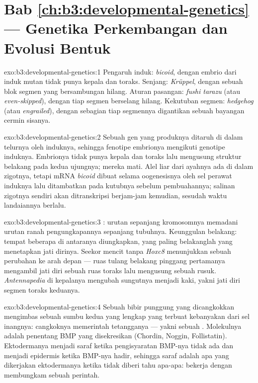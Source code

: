 \section*{Bab \ref{ch:b3:developmental-genetics} --- Genetika Perkembangan dan Evolusi Bentuk}

\begin{solution}{exo:b3:developmental-genetics:1}
Pengaruh induk: \emph{bicoid}, dengan embrio dari induk mutan tidak punya kepala
dan toraks. Senjang: \emph{Krüppel}, dengan sebuah blok segmen yang bersambungan
hilang. Aturan pasangan: \emph{fushi tarazu} (atau \emph{even-skipped}), dengan tiap
segmen berselang hilang. Kekutuban segmen: \emph{hedgehog} (atau
\emph{engrailed}), dengan sebagian tiap segmennya digantikan sebuah bayangan cermin
sisanya.
\end{solution}

\begin{solution}{exo:b3:developmental-genetics:2}
Sebuah gen yang produknya ditaruh di dalam telurnya oleh induknya, sehingga
fenotipe embrionya mengikuti genotipe induknya. Embrionya tidak punya kepala dan
toraks lalu mengusung struktur belakang pada kedua ujungnya; mereka mati.
Alel liar dari ayahnya ada di dalam zigotnya, tetapi mRNA \emph{bicoid}
dibuat selama oogenesisnya oleh sel perawat induknya lalu ditambatkan pada
kutubnya sebelum pembuahannya; salinan zigotnya sendiri akan ditranskripsi
berjam-jam kemudian, sesudah waktu landaiannya berlalu.
\end{solution}

\begin{solution}{exo:b3:developmental-genetics:3}
: urutan  sepanjang kromosomnya memadani
urutan ranah pengungkapannya sepanjang tubuhnya. Keunggulan belakang:
tempat beberapa di antaranya diungkapkan, yang paling belakanglah yang menetapkan jati dirinya.
Seekor mencit tanpa \emph{Hoxc8} menunjukkan sebuah perubahan ke arah depan --- ruas
tulang belakang pinggang pertamanya mengambil jati diri sebuah ruas toraks lalu mengusung
sebuah rusuk. \emph{Antennapedia} di kepalanya mengubah sungutnya menjadi kaki, yakni
jati diri segmen toraks keduanya.
\end{solution}

\begin{solution}{exo:b3:developmental-genetics:4}
Sebuah bibir punggung yang dicangkokkan mengimbas sebuah sumbu kedua yang lengkap yang terbuat kebanyakan dari
sel inangnya: cangkoknya memerintah tetangganya --- yakni sebuah . Molekulnya
adalah penentang BMP yang disekresikan (Chordin, Noggin, Follistatin).
Ektodermanya menjadi saraf ketika pengisyaratan BMP-nya tidak ada dan menjadi epidermis
ketika BMP-nya hadir, sehingga saraf adalah apa yang dikerjakan ektodermanya ketika tidak diberi tahu apa-apa:
 bekerja dengan membungkam sebuah perintah.
\end{solution}

